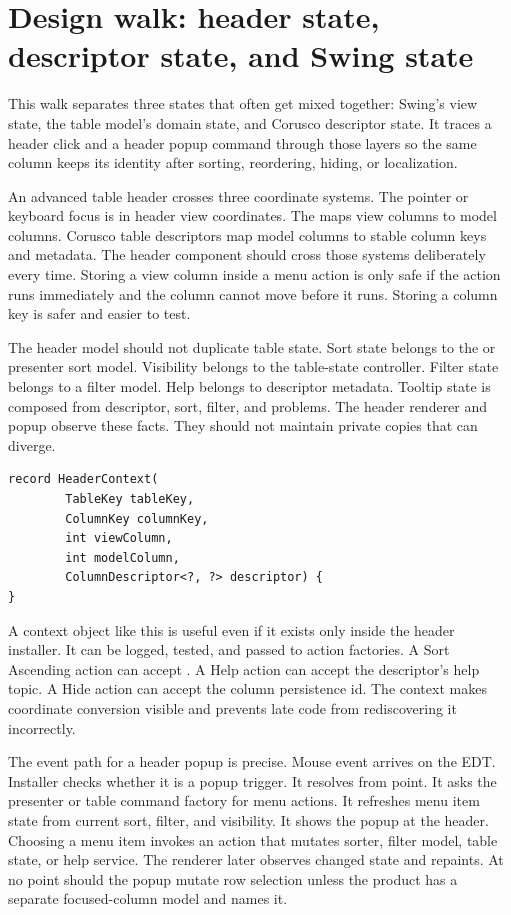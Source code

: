 \section{Design walk: header state, descriptor state, and Swing state}

\begin{roadmapbox}
This walk separates three states that often get mixed together: Swing's view
state, the table model's domain state, and Corusco descriptor state. It traces a
header click and a header popup command through those layers so the same column
keeps its identity after sorting, reordering, hiding, or localization.
\end{roadmapbox}

An advanced table header crosses three coordinate systems. The pointer or keyboard focus
is in header view coordinates. The  maps view columns to model columns.
Corusco table descriptors map model columns to stable column keys and metadata. The
header component should cross those systems deliberately every time. Storing a view
column inside a menu action is only safe if the action runs immediately and the column
cannot move before it runs. Storing a column key is safer and easier to test.

The header model should not duplicate table state. Sort state belongs to the
 or presenter sort model. Visibility belongs to the table-state
controller. Filter state belongs to a filter model. Help belongs to descriptor metadata.
Tooltip state is composed from descriptor, sort, filter, and problems. The header
renderer and popup observe these facts. They should not maintain private copies that can
diverge.

\begin{lstlisting}[caption={Header context names the resolved table facts.}]
record HeaderContext(
        TableKey tableKey,
        ColumnKey columnKey,
        int viewColumn,
        int modelColumn,
        ColumnDescriptor<?, ?> descriptor) {
}
\end{lstlisting}

A context object like this is useful even if it exists only inside the header installer.
It can be logged, tested, and passed to action factories. A Sort Ascending action can
accept
. A Help action can
accept the descriptor's help topic. A Hide action can accept the column persistence id.
The context makes coordinate conversion visible and prevents late code from
rediscovering it incorrectly.

The event path for a header popup is precise. Mouse event arrives on the EDT. Installer
checks whether it is a popup trigger. It resolves
from point. It asks the presenter or table command factory for menu actions. It
refreshes menu item state from current sort, filter, and visibility. It shows the popup
at the header. Choosing a menu item invokes an action that mutates sorter, filter model,
table state, or help service. The renderer later observes changed state and repaints. At
no point should the popup mutate row selection unless the product has a separate
focused-column model and names it.


